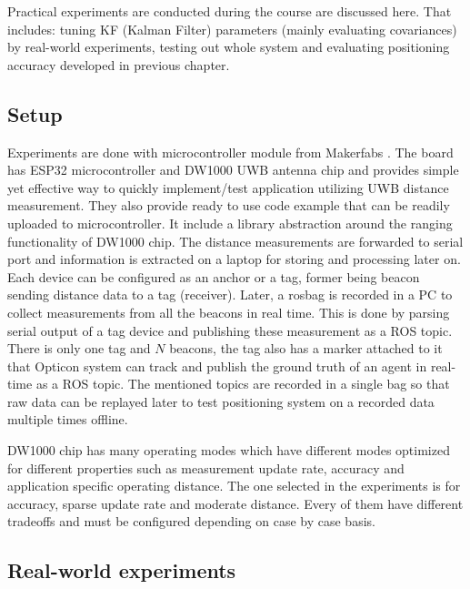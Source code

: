 Practical experiments are conducted during the course are discussed here. That includes: tuning KF (Kalman Filter) parameters (mainly evaluating covariances) by real-world experiments, testing out whole system and evaluating positioning accuracy developed in previous chapter.

\subsection{Setup}

Experiments are done with microcontroller module from Makerfabs \cite{makerfabs}. The board has ESP32 microcontroller and DW1000 UWB antenna chip and provides simple yet effective way to quickly implement/test application utilizing UWB distance measurement. They also provide ready to use code example that can be readily uploaded to microcontroller. It include a library abstraction around the ranging functionality of DW1000 chip. The distance measurements are forwarded to serial port and information is extracted on a laptop for storing and processing later on. Each device can be configured as an anchor or a tag, former being beacon sending distance data to a tag (receiver). Later, a rosbag is recorded in a PC to collect measurements from all the beacons in real time. This is done by parsing serial output of a tag device and publishing these measurement as a ROS topic. There is only one tag and $N$ beacons, the tag also has a marker attached to it that Opticon system can track and publish the ground truth of an agent in real-time as a ROS topic. The mentioned topics are recorded in a single bag so that raw data can be replayed later to test positioning system on a recorded data multiple times offline.

DW1000 chip has many operating modes which have different modes optimized for different properties such as measurement update rate, accuracy and application specific operating distance. The one selected in the experiments is for accuracy, sparse update rate and moderate distance. Every of them have different tradeoffs and must be configured depending on case by case basis.

\subsection{Real-world experiments}

